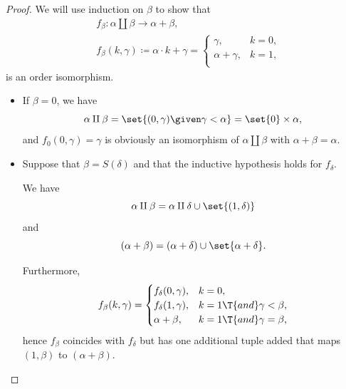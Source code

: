 \begin{proof}
  We will use induction on \( \beta \) to show that
  \begin{equation*}
    \begin{aligned}
      &f_\beta: \alpha \amalg \beta \to \alpha + \beta, \\
      &f_\beta(k, \gamma) \coloneqq \alpha \cdot k + \gamma = \begin{cases}
        \gamma,          &k = 0, \\
        \alpha + \gamma, &k = 1, \\
      \end{cases}
    \end{aligned}
  \end{equation*}
  is an order isomorphism.

  \begin{itemize}
    \item If \( \beta = 0 \), we have
    \begin{equation*}
       \alpha \amalg \beta = \set{ (0, \gamma) \given \gamma < \alpha } = \set{ 0 } \times \alpha,
    \end{equation*}
    and \( f_0(0, \gamma) = \gamma \) is obviously an isomorphism of \( \alpha \amalg \beta \) with \( \alpha + \beta = \alpha \).

    \item Suppose that \( \beta = S(\delta) \) and that the inductive hypothesis holds for \( f_\delta \).

    We have
    \begin{equation*}
      \alpha \amalg \beta = \alpha \amalg \delta \cup \set{ (1, \delta) }
    \end{equation*}
    and
    \begin{equation*}
      (\alpha + \beta) = (\alpha + \delta) \cup \set{ \alpha + \delta }.
    \end{equation*}

    Furthermore,
    \begin{equation*}
      f_\beta(k, \gamma) = \begin{cases}
        f_\delta(0, \gamma), &k = 0, \\
        f_\delta(1, \gamma), &k = 1 \T{and} \gamma < \beta, \\
        \alpha + \beta,      &k = 1 \T{and} \gamma = \beta,
      \end{cases}
    \end{equation*}
    hence \( f_\beta \) coincides with \( f_\delta \) but has one additional tuple added that maps \( (1, \beta) \) to \( (\alpha + \beta) \).


\end{itemize}
\end{proof}
